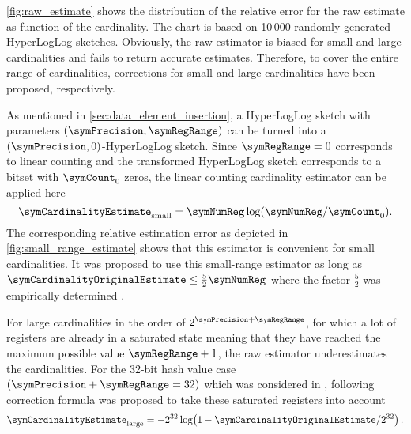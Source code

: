 \documentclass[a4paper]{scrartcl}
\begin{document}
\cref{fig:raw_estimate} shows the distribution of the relative error for the raw estimate as function of the cardinality. The chart is based on 10\,000 randomly generated HyperLogLog sketches. Obviously, the raw estimator is biased for small and large cardinalities and fails to return accurate estimates. Therefore, to cover the entire range of cardinalities, corrections for small and large cardinalities have been proposed, respectively.

As mentioned in \cref{sec:data_element_insertion}, a HyperLogLog sketch with parameters $(\symPrecision, \symRegRange)$ can be turned into a $(\symPrecision, 0)$-HyperLogLog sketch. Since $\symRegRange=0$ corresponds to linear counting and the transformed HyperLogLog sketch corresponds to a bitset with $\symCount_0$ zeros, the linear counting cardinality estimator \cite{Whang1990} can be applied here
\begin{equation}
\label{equ:small_range_estimate}
\symCardinalityEstimate_\text{small} = \symNumReg \log(\symNumReg/\symCount_0).
\end{equation}
The corresponding relative estimation error as depicted in \cref{fig:small_range_estimate} shows that this estimator is convenient for small cardinalities. It was proposed to use this small-range estimator as long as $\symCardinalityOriginalEstimate \leq \frac{5}{2}\symNumReg$ where the factor $\frac{5}{2}$ was empirically determined \cite{Flajolet2007}. 

For large cardinalities in the order of $2^{\symPrecision+\symRegRange}$, for which a lot of registers are already in a saturated state meaning that they have reached the maximum possible value $\symRegRange + 1$, the raw estimator underestimates the cardinalities. For the 32-bit hash value case $(\symPrecision+\symRegRange=32)$ which was considered in \cite{Flajolet2007}, following correction formula was proposed to take these saturated registers into account
\begin{equation}
\label{equ:large_range_estimate}
\symCardinalityEstimate_\text{large}
=
-2^{32}\log\!\left(1-\symCardinalityOriginalEstimate/2^{32}\right).
\end{equation}
\end{document}
